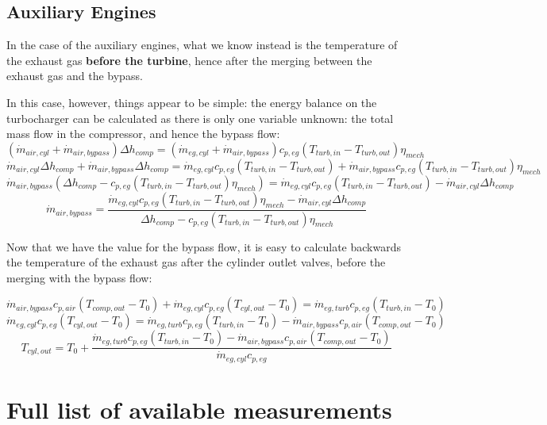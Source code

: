 \documentclass[preprint,12pt]{elsarticle}
\begin{document}
\subsection{Auxiliary Engines}

In the case of the auxiliary engines, what we know instead is the temperature of the exhaust gas \textbf{before the turbine}, hence after the merging between the exhaust gas and the bypass.

In this case, however, things appear to be simple: the energy balance on the turbocharger can be calculated as there is only one variable unknown: the total mass flow in the compressor, and hence the bypass flow:
$$
(\dot{m}_{air,cyl} + \dot{m}_{air,bypass}) \Delta h_{comp} = (\dot{m}_{eg,cyl} + \dot{m}_{air,bypass}) c_{p,eg} (T_{turb,in} - T_{turb,out}) \eta_{mech}
$$
$$
\dot{m}_{air,cyl} \Delta h_{comp} + \dot{m}_{air,bypass} \Delta h_{comp} = \dot{m}_{eg,cyl} c_{p,eg} (T_{turb,in} - T_{turb,out}) + \dot{m}_{air,bypass} c_{p,eg} (T_{turb,in} - T_{turb,out}) \eta_{mech}
$$
$$
\dot{m}_{air,bypass} (\Delta h_{comp} - c_{p,eg} (T_{turb,in} - T_{turb,out}) \eta_{mech}) = \dot{m}_{eg,cyl} c_{p,eg} (T_{turb,in} - T_{turb,out}) - \dot{m}_{air,cyl} \Delta h_{comp}
$$
\begin{equation}
\dot{m}_{air,bypass} = \frac{\dot{m}_{eg,cyl} c_{p,eg} (T_{turb,in} - T_{turb,out}) \eta_{mech} - \dot{m}_{air,cyl} \Delta h_{comp}}{\Delta h_{comp} - c_{p,eg} (T_{turb,in} - T_{turb,out}) \eta_{mech}}
\end{equation}

Now that we have the value for the bypass flow, it is easy to calculate backwards the temperature of the exhaust gas after the cylinder outlet valves, before the merging with the bypass flow:

$$
\dot{m}_{air,bypass} c_{p,air} (T_{comp,out} - T_0) + \dot{m}_{eg,cyl} c_{p,eg}  (T_{cyl,out} - T_0) = \dot{m}_{eg,turb} c_{p,eg} (T_{turb,in} - T_0)
$$
$$
\dot{m}_{eg,cyl} c_{p,eg}  (T_{cyl,out} - T_0) = \dot{m}_{eg,turb} c_{p,eg} (T_{turb,in} - T_0) - \dot{m}_{air,bypass} c_{p,air} (T_{comp,out} - T_0)
$$
\begin{equation}
T_{cyl,out} = T_0 + \frac{\dot{m}_{eg,turb} c_{p,eg} (T_{turb,in} - T_0) - \dot{m}_{air,bypass} c_{p,air} (T_{comp,out} - T_0)}{\dot{m}_{eg,cyl} c_{p,eg}}
\end{equation}

\section{Full list of available measurements}




\end{document}
